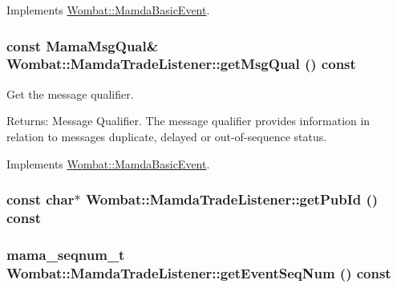 Implements \hyperlink{classWombat_1_1MamdaBasicEvent_b0602a83bec20cd8b341ec866ff3bffa}{Wombat::Mamda\-Basic\-Event}.\hypertarget{classWombat_1_1MamdaTradeListener_99049505686f05acab6e3c84c0d0b5b1}{
\subsubsection[getMsgQual]{\setlength{\rightskip}{0pt plus 5cm}const Mama\-Msg\-Qual\& Wombat::Mamda\-Trade\-Listener::get\-Msg\-Qual () const}}
\label{classWombat_1_1MamdaTradeListener_99049505686f05acab6e3c84c0d0b5b1}


Get the message qualifier. 

\begin{Desc}
\item[Returns:]Message Qualifier. The message qualifier provides information in relation to messages duplicate, delayed or out-of-sequence status. \end{Desc}


Implements \hyperlink{classWombat_1_1MamdaBasicEvent_675ce8f1de581548426335423d6b3864}{Wombat::Mamda\-Basic\-Event}.\hypertarget{classWombat_1_1MamdaTradeListener_8d34c323fa0ca67ffbdc40625a84bf62}{
\subsubsection[getPubId]{\setlength{\rightskip}{0pt plus 5cm}const char$\ast$ Wombat::Mamda\-Trade\-Listener::get\-Pub\-Id () const}}
\label{classWombat_1_1MamdaTradeListener_8d34c323fa0ca67ffbdc40625a84bf62}


\hypertarget{classWombat_1_1MamdaTradeListener_8289ac1ca750b7fb99e29c122e37caad}{
\subsubsection[getEventSeqNum]{\setlength{\rightskip}{0pt plus 5cm}mama\_\-seqnum\_\-t Wombat::Mamda\-Trade\-Listener::get\-Event\-Seq\-Num () const}}
\label{classWombat_1_1MamdaTradeListener_8289ac1ca750b7fb99e29c122e37caad}


